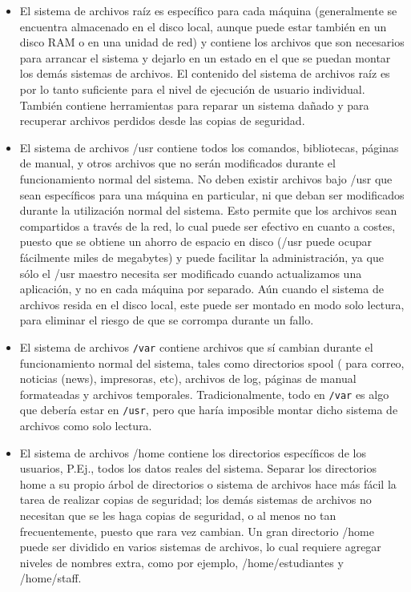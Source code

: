 \begin{itemize} \item{ El sistema de archivos raíz es específico para
cada máquina (generalmente se encuentra almacenado en el disco local, aunque
puede estar también en un disco RAM o en una unidad de red) y contiene los
archivos que son necesarios para arrancar el sistema y dejarlo en un estado en
el que se puedan montar los demás sistemas de archivos. El contenido del sistema
de archivos raíz es por lo tanto suficiente para el nivel de ejecución de
usuario individual. También contiene herramientas para reparar un sistema dañado
y para recuperar archivos perdidos desde las copias de seguridad.
}

\item{ El sistema de archivos /usr contiene todos los comandos,
bibliotecas, páginas de manual, y otros archivos que no serán modificados durante
el funcionamiento normal del sistema. No deben existir archivos bajo /usr que
sean específicos para una máquina en particular, ni que deban ser modificados
durante la utilización normal del sistema. Esto permite que los archivos sean
compartidos a través de la red, lo cual puede ser efectivo en cuanto a costes,
puesto que se obtiene un ahorro de espacio en disco (/usr puede ocupar
fácilmente miles de megabytes) y puede facilitar la administración, ya que sólo
el /usr maestro necesita ser modificado cuando actualizamos una aplicación, y no
en cada máquina por separado. Aún cuando el sistema de archivos resida en el
disco local, este puede ser montado en modo solo lectura, para eliminar el
riesgo de que se corrompa durante un fallo.  }

\item{  El sistema de archivos \texttt{/var} contiene
archivos que sí cambian durante el funcionamiento normal del sistema, tales como
directorios spool ( para correo, noticias (news), impresoras, etc), archivos de
log, páginas de manual formateadas y archivos temporales.  Tradicionalmente,
todo en \texttt{/var} es algo que debería estar en
\texttt{/usr}, pero que haría imposible montar dicho
sistema de archivos como solo lectura. }

\item{ El sistema de archivos /home contiene los directorios
específicos de los usuarios, P.Ej., todos los datos reales del sistema. Separar
los directorios home a su propio árbol de directorios o sistema de archivos hace
más fácil la tarea de realizar copias de seguridad; los demás sistemas de
archivos no necesitan que se les haga copias de seguridad, o al menos no tan
frecuentemente, puesto que  rara vez cambian. Un gran directorio /home puede ser
dividido en varios sistemas de archivos, lo cual requiere agregar niveles de
nombres extra, como por ejemplo, /home/estudiantes y /home/staff.
}


\end{itemize}
